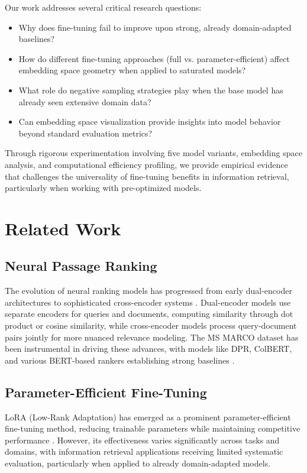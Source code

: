 \documentclass[conference]{IEEEtran}
\begin{document}
Our work addresses several critical research questions:

\begin{itemize}
\item Why does fine-tuning fail to improve upon strong, already domain-adapted baselines?
\item How do different fine-tuning approaches (full vs. parameter-efficient) affect embedding space geometry when applied to saturated models?
\item What role do negative sampling strategies play when the base model has already seen extensive domain data?
\item Can embedding space visualization provide insights into model behavior beyond standard evaluation metrics?
\end{itemize}

Through rigorous experimentation involving five model variants, embedding space analysis, and computational efficiency profiling, we provide empirical evidence that challenges the universality of fine-tuning benefits in information retrieval, particularly when working with pre-optimized models.

\section{Related Work}
\subsection{Neural Passage Ranking}
The evolution of neural ranking models has progressed from early dual-encoder architectures \cite{dong2022exploring} to sophisticated cross-encoder systems \cite{lu2025crossencoder, karpukhin2020dense}. Dual-encoder models use separate encoders for queries and documents, computing similarity through dot product or cosine similarity, while cross-encoder models process query-document pairs jointly for more nuanced relevance modeling. The MS MARCO dataset has been instrumental in driving these advances, with models like DPR, ColBERT, and various BERT-based rankers establishing strong baselines \cite{khattab2020colbert}.

\subsection{Parameter-Efficient Fine-Tuning}
LoRA (Low-Rank Adaptation) has emerged as a prominent parameter-efficient fine-tuning method, reducing trainable parameters while maintaining competitive performance \cite{hu2021lora}. However, its effectiveness varies significantly across tasks and domains, with information retrieval applications receiving limited systematic evaluation, particularly when applied to already domain-adapted models.
\end{document}
